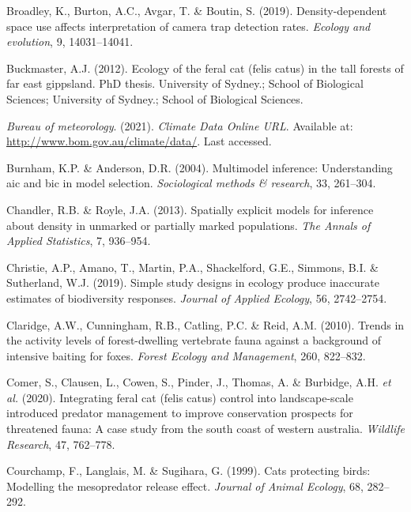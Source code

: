 \documentclass[]{elsarticle} %
\begin{document}
\leavevmode\hypertarget{ref-broadley2019}{}%
Broadley, K., Burton, A.C., Avgar, T. \& Boutin, S. (2019). Density-dependent space use affects interpretation of camera trap detection rates. \emph{Ecology and evolution}, 9, 14031--14041.

\leavevmode\hypertarget{ref-2123-8123}{}%
Buckmaster, A.J. (2012). Ecology of the feral cat (felis catus) in the tall forests of far east gippsland. PhD thesis. University of Sydney.; School of Biological Sciences; University of Sydney.; School of Biological Sciences.

\leavevmode\hypertarget{ref-BOM2021}{}%
\emph{Bureau of meteorology}. (2021). \emph{Climate Data Online URL}. Available at: \url{http://www.bom.gov.au/climate/data/}. Last accessed.

\leavevmode\hypertarget{ref-burnham2004}{}%
Burnham, K.P. \& Anderson, D.R. (2004). Multimodel inference: Understanding aic and bic in model selection. \emph{Sociological methods \& research}, 33, 261--304.

\leavevmode\hypertarget{ref-10.2307ux2f23566419}{}%
Chandler, R.B. \& Royle, J.A. (2013). Spatially explicit models for inference about density in unmarked or partially marked populations. \emph{The Annals of Applied Statistics}, 7, 936--954.

\leavevmode\hypertarget{ref-christie2019}{}%
Christie, A.P., Amano, T., Martin, P.A., Shackelford, G.E., Simmons, B.I. \& Sutherland, W.J. (2019). Simple study designs in ecology produce inaccurate estimates of biodiversity responses. \emph{Journal of Applied Ecology}, 56, 2742--2754.

\leavevmode\hypertarget{ref-claridge2010}{}%
Claridge, A.W., Cunningham, R.B., Catling, P.C. \& Reid, A.M. (2010). Trends in the activity levels of forest-dwelling vertebrate fauna against a background of intensive baiting for foxes. \emph{Forest Ecology and Management}, 260, 822--832.

\leavevmode\hypertarget{ref-comer2020integrating}{}%
Comer, S., Clausen, L., Cowen, S., Pinder, J., Thomas, A. \& Burbidge, A.H. \emph{et al.} (2020). Integrating feral cat (felis catus) control into landscape-scale introduced predator management to improve conservation prospects for threatened fauna: A case study from the south coast of western australia. \emph{Wildlife Research}, 47, 762--778.

\leavevmode\hypertarget{ref-courchamp1999}{}%
Courchamp, F., Langlais, M. \& Sugihara, G. (1999). Cats protecting birds: Modelling the mesopredator release effect. \emph{Journal of Animal Ecology}, 68, 282--292.
\end{document}

